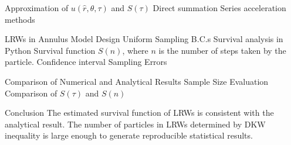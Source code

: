 \begin{outline}[enumerate]
    \2 Approximation of $u(\hat r, \theta, \tau)$ and $S(\tau)$
      \3 Direct summation
      \3 Series acceleration methods   

  \1 LRWs in Annulus
    \2 Model Design
      \3 Uniform Sampling
      \3 B.C.s
    \2 Survival analysis in Python \cite{cameron_davidson_pilon_2020_4313838}
       \3 Survival function $S(n)$, where $n$ is the number of steps taken by the particle. 
       \3 Confidence interval
    \2 Sampling Errors

  \1 Comparison of Numerical and Analytical Results
    \2 Sample Size Evaluation
    \2 Comparison of $S(\tau)$ and $S(n)$

  \1 Conclusion
    \2 The estimated survival function of LRWs is consistent with the analytical result.
    \2 The number of particles in LRWs determined by DKW inequality is large enough to generate reproducible statistical results. 

      





\end{outline}
